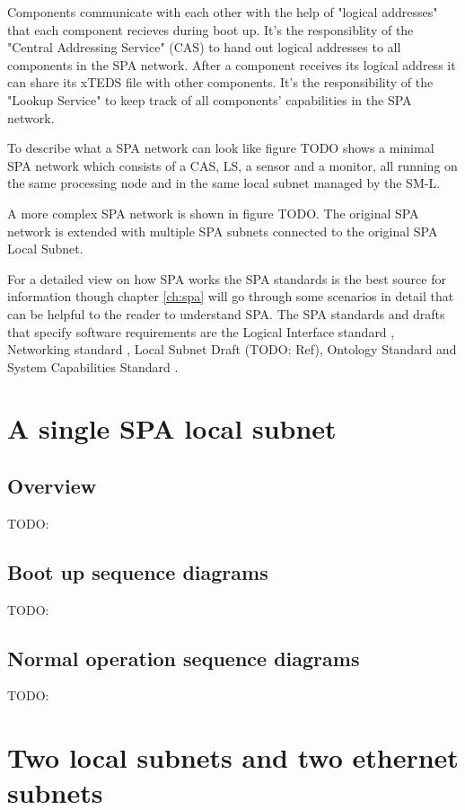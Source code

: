 Components communicate with each other with the help of "logical addresses"
that each component recieves during boot up. It's the responsiblity of the
"Central Addressing Service" (CAS) to hand out logical addresses to all
components in the SPA network. After a component receives its logical address
it can share its xTEDS file with other components. It's the responsibility of
the "Lookup Service" to keep track of all components' capabilities in the SPA
network.

To describe what a SPA network can look like figure TODO shows a minimal SPA
network which consists of a CAS, LS, a sensor and a monitor, all running on the
same processing node and in the same local subnet managed by the SM-L.

A more complex SPA network is shown in figure TODO. The original SPA network is
extended with multiple SPA subnets connected to the original SPA Local Subnet.

For a detailed view on how SPA works the SPA standards is the best source for
information though chapter \ref{ch:spa} will go through some scenarios in
detail that can be helpful to the reader to understand SPA. The SPA standards
and drafts that specify software requirements are the Logical Interface
standard \cite{spa:logical-interface}, Networking standard
\cite{spa:networking}, Local Subnet Draft (TODO: Ref), Ontology Standard
\cite{spa:ontology} and System Capabilities Standard
\cite{spa:system-capabilities}.

\section{A single SPA local subnet}
\subsection{Overview}
TODO:

\subsection{Boot up sequence diagrams}
TODO:

\subsection{Normal operation sequence diagrams}
TODO:

\section{Two local subnets and two ethernet subnets}
